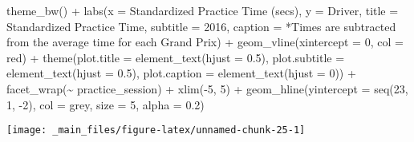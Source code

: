 \documentclass[
]{book}
\newenvironment{Shaded}{\begin{snugshade}}{\end{snugshade}}
\newcommand{\AttributeTok}[1]{\textcolor[rgb]{0.77,0.63,0.00}{#1}}
\newcommand{\DecValTok}[1]{\textcolor[rgb]{0.00,0.00,0.81}{#1}}
\newcommand{\FloatTok}[1]{\textcolor[rgb]{0.00,0.00,0.81}{#1}}
\newcommand{\FunctionTok}[1]{\textcolor[rgb]{0.00,0.00,0.00}{#1}}
\newcommand{\NormalTok}[1]{#1}
\newcommand{\SpecialCharTok}[1]{\textcolor[rgb]{0.00,0.00,0.00}{#1}}
\newcommand{\StringTok}[1]{\textcolor[rgb]{0.31,0.60,0.02}{#1}}
\begin{document}
\begin{Shaded}
\begin{Highlighting}[]
   \FunctionTok{theme\_bw}\NormalTok{() }\SpecialCharTok{+}
   \FunctionTok{labs}\NormalTok{(}\AttributeTok{x =} \StringTok{\textquotesingle{}Standardized Practice Time (secs)\textquotesingle{}}\NormalTok{,}
        \AttributeTok{y =} \StringTok{\textquotesingle{}Driver\textquotesingle{}}\NormalTok{,}
        \AttributeTok{title =} \StringTok{\textquotesingle{}Standardized Practice Time\textquotesingle{}}\NormalTok{,}
        \AttributeTok{subtitle =} \StringTok{\textquotesingle{}2016\textquotesingle{}}\NormalTok{,}
        \AttributeTok{caption =} \StringTok{\textquotesingle{}*Times are subtracted from the average time for each Grand Prix\textquotesingle{}}\NormalTok{) }\SpecialCharTok{+}
   \FunctionTok{geom\_vline}\NormalTok{(}\AttributeTok{xintercept =} \DecValTok{0}\NormalTok{, }\AttributeTok{col =} \StringTok{\textquotesingle{}red\textquotesingle{}}\NormalTok{) }\SpecialCharTok{+}
   \FunctionTok{theme}\NormalTok{(}\AttributeTok{plot.title =} \FunctionTok{element\_text}\NormalTok{(}\AttributeTok{hjust =} \FloatTok{0.5}\NormalTok{),}
         \AttributeTok{plot.subtitle =} \FunctionTok{element\_text}\NormalTok{(}\AttributeTok{hjust =} \FloatTok{0.5}\NormalTok{),}
         \AttributeTok{plot.caption =} \FunctionTok{element\_text}\NormalTok{(}\AttributeTok{hjust =} \DecValTok{0}\NormalTok{)) }\SpecialCharTok{+}
  \FunctionTok{facet\_wrap}\NormalTok{(}\SpecialCharTok{\textasciitilde{}}\NormalTok{ practice\_session) }\SpecialCharTok{+}
  \FunctionTok{xlim}\NormalTok{(}\SpecialCharTok{{-}}\DecValTok{5}\NormalTok{, }\DecValTok{5}\NormalTok{) }\SpecialCharTok{+}
  \FunctionTok{geom\_hline}\NormalTok{(}\AttributeTok{yintercept =} \FunctionTok{seq}\NormalTok{(}\DecValTok{23}\NormalTok{, }\DecValTok{1}\NormalTok{, }\SpecialCharTok{{-}}\DecValTok{2}\NormalTok{), }\AttributeTok{col =} \StringTok{\textquotesingle{}grey\textquotesingle{}}\NormalTok{, }\AttributeTok{size =} \DecValTok{5}\NormalTok{, }\AttributeTok{alpha =}  \FloatTok{0.2}\NormalTok{)}
\end{Highlighting}
\end{Shaded}

\begin{center}\texttt{[image: \_main\_files/figure-latex/unnamed-chunk-25-1]} \end{center}
\end{document}

